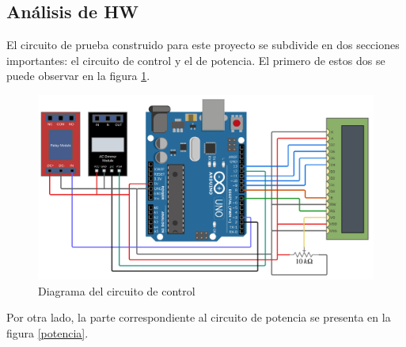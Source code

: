 \subsection{Análisis de HW}

El circuito de prueba construido para este proyecto se subdivide en dos secciones importantes: el circuito de control y el de potencia. El primero de estos dos se puede observar en la figura \ref{circuito_control}.

\begin{figure}[H]
\centering
\includegraphics[scale=0.62]{./images/control.png} 
\caption{Diagrama del circuito de control}
\label{circuito_control}
\end{figure}

\vspace*{-0.3cm}

Por otra lado, la parte correspondiente al circuito de potencia se presenta en la figura \ref{potencia}.

